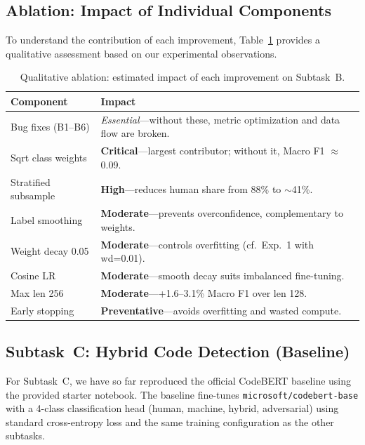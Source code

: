 \documentclass[11pt]{article}
\begin{document}
\subsection{Ablation: Impact of Individual Components}

To understand the contribution of each improvement, Table~\ref{tab:ablation} provides a qualitative assessment based on our experimental observations.

\begin{table}[htbp]
\centering
\footnotesize
\begin{tabularx}{\columnwidth}{@{}l X@{}}
\toprule
\textbf{Component} & \textbf{Impact} \\ \midrule
Bug fixes (B1--B6) & \textit{Essential}---without these, metric optimization and data flow are broken. \\
Sqrt class weights & \textbf{Critical}---largest contributor; without it, Macro F1 $\approx$ 0.09. \\
Stratified subsample & \textbf{High}---reduces human share from 88\% to $\sim$41\%. \\
Label smoothing & \textbf{Moderate}---prevents overconfidence, complementary to weights. \\
Weight decay 0.05 & \textbf{Moderate}---controls overfitting (cf.\ Exp.~1 with wd=0.01). \\
Cosine LR & \textbf{Moderate}---smooth decay suits imbalanced fine-tuning. \\
Max len 256 & \textbf{Moderate}---+1.6--3.1\% Macro F1 over len 128. \\
Early stopping & \textbf{Preventative}---avoids overfitting and wasted compute. \\
\bottomrule
\end{tabularx}
\caption{Qualitative ablation: estimated impact of each improvement on Subtask~B.}
\label{tab:ablation}
\end{table}

\subsection{Subtask~C: Hybrid Code Detection (Baseline)}
\label{sec:taskC_results}

For Subtask~C, we have so far reproduced the official CodeBERT baseline using the provided starter notebook. The baseline fine-tunes \texttt{microsoft/codebert-base} with a 4-class classification head (human, machine, hybrid, adversarial) using standard cross-entropy loss and the same training configuration as the other subtasks.
\end{document}
